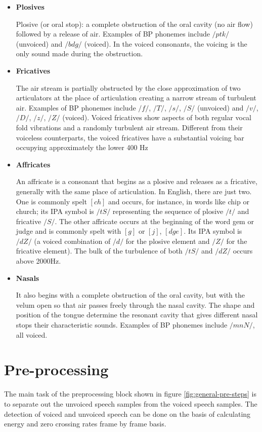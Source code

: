 \documentclass[12pt, a4paper, twoside]{report}
\begin{document}
\begin{itemize}
\item \textbf{Plosives} \par
Plosive (or oral stop): a complete obstruction of the oral cavity (no air flow) followed by a release of air. Examples of BP phonemes include $/p t k/$ (unvoiced) and $/b d g/$ (voiced). In the voiced consonants, the voicing is the only sound made during the obstruction.
\item \textbf{Fricatives} \par
The air stream is partially obstructed by the close approximation of two articulators at the place of articulation creating a narrow stream of turbulent air. Examples of BP phonemes include $/f/$, $/T/$, $/s/$, $/S/$ (unvoiced) and $/v/$, $/D/$, $/z/$, $/Z/$ (voiced). Voiced fricatives show aspects of both regular vocal fold vibrations and a randomly turbulent air stream. Different from their voiceless counterparts, the voiced fricatives have a substantial voicing bar occupying approximately the lower 400 Hz
\item \textbf{Affricates} \par
An affricate is a consonant that begins as a plosive and releases as a fricative, generally with the same place of articulation. In English, there are just two. One is commonly spelt $[ch]$ and occurs, for instance, in words like chip or church; its IPA symbol is $/tS/$ representing the sequence of plosive $/ t /$ and fricative $/ S /$. The other affricate occurs at the beginning of the word gem or judge and is commonly spelt with $[g]$ or $[j]$, $[dge]$. Its IPA symbol is $/dZ/$ (a voiced combination of $/ d /$ for the plosive element and $/ Z /$ for the fricative element). The bulk of the turbulence of both $/tS/$ and $/dZ/$ occurs above 2000Hz.
\item \textbf{Nasals} \par
It also begins with a complete obstruction of the oral cavity, but with the velum open so that air passes freely through the nasal cavity. The shape and position of the tongue determine the resonant cavity that gives different nasal stops their characteristic sounds. Examples of BP phonemes include $/m n N/$, all voiced.
\end{itemize}

\section{Pre-processing}
The main task of the preprocessing block shown in figure \ref{fig:general-pre-steps} is to separate out the unvoiced speech samples from the voiced speech samples. The detection of voiced and unvoiced speech can be done on the basis of calculating energy and zero crossing rates frame by frame basis.
\end{document}

